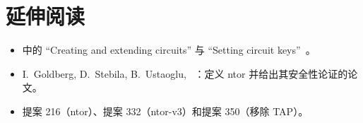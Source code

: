 \section*{延伸阅读}
\begin{itemize}
  \item {} 中的 \enquote{Creating and extending circuits} 与 \enquote{Setting circuit keys}~\cite{torspec}。
  \item I.~Goldberg, D.~Stebila, B.~Ustaoglu, ~\cite{goldberg2013ntor}：定义 ntor 并给出其安全性论证的论文。
  \item 提案 216（ntor）、提案 332（ntor-v3）和提案 350（移除 TAP）。
\end{itemize}
